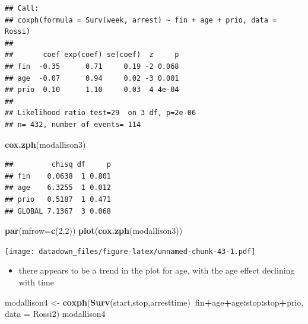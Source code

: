 \documentclass[]{book}
\newenvironment{Shaded}{\begin{snugshade}}{\end{snugshade}}
\newcommand{\DataTypeTok}[1]{\textcolor[rgb]{0.13,0.29,0.53}{#1}}
\newcommand{\DecValTok}[1]{\textcolor[rgb]{0.00,0.00,0.81}{#1}}
\newcommand{\KeywordTok}[1]{\textcolor[rgb]{0.13,0.29,0.53}{\textbf{#1}}}
\newcommand{\NormalTok}[1]{#1}
\newcommand{\OperatorTok}[1]{\textcolor[rgb]{0.81,0.36,0.00}{\textbf{#1}}}
\newcommand{\StringTok}[1]{\textcolor[rgb]{0.31,0.60,0.02}{#1}}
\providecommand{\tightlist}{%
  \setlength{\itemsep}{0pt}\setlength{\parskip}{0pt}}
\begin{document}
\begin{verbatim}
## Call:
## coxph(formula = Surv(week, arrest) ~ fin + age + prio, data = Rossi)
## 
##       coef exp(coef) se(coef)  z     p
## fin  -0.35      0.71     0.19 -2 0.068
## age  -0.07      0.94     0.02 -3 0.001
## prio  0.10      1.10     0.03  4 4e-04
## 
## Likelihood ratio test=29  on 3 df, p=2e-06
## n= 432, number of events= 114
\end{verbatim}

\begin{Shaded}
\begin{Highlighting}[]
\KeywordTok{cox.zph}\NormalTok{(modallison3)}
\end{Highlighting}
\end{Shaded}

\begin{verbatim}
##         chisq df     p
## fin    0.0638  1 0.801
## age    6.3255  1 0.012
## prio   0.5187  1 0.471
## GLOBAL 7.1367  3 0.068
\end{verbatim}

\begin{Shaded}
\begin{Highlighting}[]
\KeywordTok{par}\NormalTok{(}\DataTypeTok{mfrow=}\KeywordTok{c}\NormalTok{(}\DecValTok{2}\NormalTok{,}\DecValTok{2}\NormalTok{))}
\KeywordTok{plot}\NormalTok{(}\KeywordTok{cox.zph}\NormalTok{(modallison3))}
\end{Highlighting}
\end{Shaded}

\texttt{[image: datadown\_files/figure-latex/unnamed-chunk-43-1.pdf]}

\begin{itemize}
\tightlist
\item
  there appears to be a trend in the plot for age, with the age effect declining with time
\end{itemize}

\begin{Shaded}
\begin{Highlighting}[]
\NormalTok{modallison4 <-}\StringTok{ }\KeywordTok{coxph}\NormalTok{(}\KeywordTok{Surv}\NormalTok{(start,stop,arresttime)}\OperatorTok{~}\NormalTok{fin}\OperatorTok{+}\NormalTok{age}\OperatorTok{+}\NormalTok{age}\OperatorTok{:}\NormalTok{stop}\OperatorTok{:}\NormalTok{stop}\OperatorTok{+}\NormalTok{prio, }\DataTypeTok{data =}\NormalTok{ Rossi2)}
\NormalTok{modallison4}
\end{Highlighting}
\end{Shaded}
\end{document}
